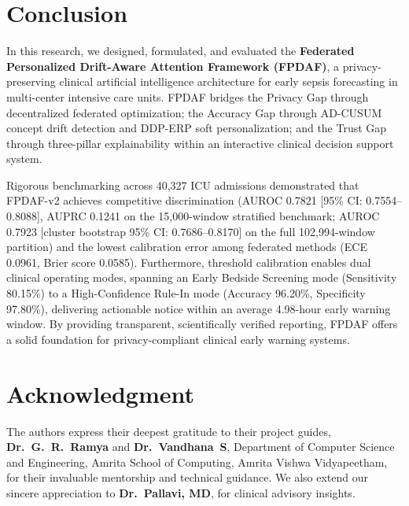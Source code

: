 \documentclass[final,5p,times,twocolumn]{elsarticle}
\begin{document}
\section{Conclusion}
In this research, we designed, formulated, and evaluated the \textbf{Federated Personalized Drift-Aware Attention Framework (FPDAF)}, a privacy-preserving clinical artificial intelligence architecture for early sepsis forecasting in multi-center intensive care units. FPDAF bridges the Privacy Gap through decentralized federated optimization; the Accuracy Gap through AD-CUSUM concept drift detection and DDP-ERP soft personalization; and the Trust Gap through three-pillar explainability within an interactive clinical decision support system.

Rigorous benchmarking across 40,327 ICU admissions demonstrated that FPDAF-v2 achieves competitive discrimination (AUROC 0.7821 [95\% CI: 0.7554--0.8088], AUPRC 0.1241 on the 15,000-window stratified benchmark; AUROC 0.7923 [cluster bootstrap 95\% CI: 0.7686--0.8170] on the full 102,994-window partition) and the lowest calibration error among federated methods (ECE 0.0961, Brier score 0.0585). Furthermore, threshold calibration enables dual clinical operating modes, spanning an Early Bedside Screening mode (Sensitivity 80.15\%) to a High-Confidence Rule-In mode (Accuracy 96.20\%, Specificity 97.80\%), delivering actionable notice within an average 4.98-hour early warning window. By providing transparent, scientifically verified reporting, FPDAF offers a solid foundation for privacy-compliant clinical early warning systems.

\section*{Acknowledgment}
The authors express their deepest gratitude to their project guides, \textbf{Dr.~G.~R.~Ramya} and \textbf{Dr.~Vandhana~S}, Department of Computer Science and Engineering, Amrita School of Computing, Amrita Vishwa Vidyapeetham, for their invaluable mentorship and technical guidance. We also extend our sincere appreciation to \textbf{Dr.~Pallavi, MD}, for clinical advisory insights.

\balance


\end{document}
